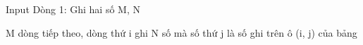 Input
Dòng 1: Ghi hai số M, N  

   M dòng tiếp theo, dòng thứ i ghi N số mà số thứ j là số ghi trên ô (i, j) của bảng